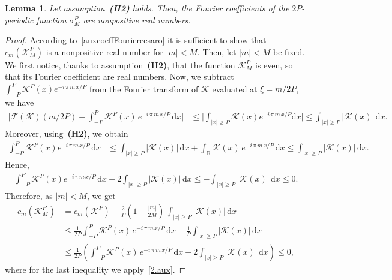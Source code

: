 \documentclass[11pt]{amsart}
\newtheorem{lemma}{Lemma}
\newcommand{\K}{\mathcal{K}}
\newcommand{\dd}{\mathrm{d}}
\newcommand{\F}{\mathcal{F}}
\begin{document}
\begin{lemma}\label{fourier series of kpdelta negative} 
Let assumption~\textbf{\emph{(H2)}} holds. Then, the Fourier coefficients of the $2P$-periodic function $\sigma_M^P$ are nonpositive real numbers.
\end{lemma}

 \begin{proof}
 According to~\eqref{auxcoeffFouriercesaro} it is sufficient to show that $c_m(\K^P_M)$ is a nonpositive real number for $|m|< M$. Then, let $|m|< M$ be fixed. We first notice, thanks to assumption~\textbf{(H2)}, that the function $\K^P_M$ is even, so that its Fourier coefficient are real numbers. Now, we subtract $\int_{-P} ^{P}\K^P(x) e^{-i \,\pi \,m \,x/P}$ from the Fourier transform of $\mathcal{K}$ evaluated at $\xi = m/2P$, we have
 \begin{align*} 
       \bigg| \F(\K)(m/2P) -  \int_{-P} ^{P}\K^P(x) \,e^{-i\, \pi\, m\, x/P} \, \dd x \bigg|  &\leq  \bigg| \int_{|x| \geq P}\mathcal{K}(x) e^{-i\, \pi\,m\, x/P} \dd x \bigg|\leq \int_{|x| \geq P} |\mathcal{K}(x)| \, \dd x. 
 \end{align*}
Moreover, using~\textbf{(H2)}, we obtain
 \begin{align*}
     \int_{-P}^{P}\K^P(x) e^{-i\, \pi\, m \,x/P} \, \dd x &\leq  \int_{|x| \geq P} |\mathcal{K}(x)| \, \dd x + \int_{\mathbb{R}}\mathcal{K}(x) \, e^{-i \,\pi\, m \, x/P }\, \dd x \leq \int_{|x| \geq P} |\mathcal{K}(x)| \, \dd x. 
 \end{align*}
Hence,
 \begin{align}\label{2.aux}
      \int_{-P}^{P}\K^P(x) e^{- i\, \pi\,m \,x/P} \, \dd x - 2 \int_{|x| \geq P}|\mathcal{K}(x)| \, \dd x \leq -  \int_{|x| \geq P} |\mathcal{K}(x)| \, \dd x  \leq 0.
 \end{align}
Therefore, as $|m|<M$, we get
\begin{align*}
    c_m(\K^P_M) &= c_m(\K^P) - \frac{2}{P} \left(1-\frac{|m|}{2M}\right) \, \int_{|x|\geq P} |\K(x)| \, \dd x \\
    & \le \frac{1}{2P} \int_{-P}^P \K^P(x) \, e^{-i \, \pi \, m \, x/P} \, \dd x - \frac{1}{P} \int_{|x|\geq P} |\K(x)| \, \dd x\\
    & \le\frac{1}{2P} \left(\int_{-P}^P \K^P(x) \, e^{-i \, \pi \, m \, x/P} \, \dd x - 2\int_{|x|\geq P} |\K(x)| \, \dd x \right) \leq 0,
\end{align*}
where for the last inequality we apply~\eqref{2.aux}.
 \end{proof}
\end{document}
